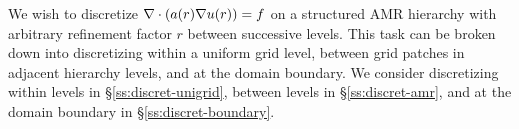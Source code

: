 \documentclass[10pt]{article}
\begin{document}
 \newcommand{\uxp}{u(\indvar+h_x)}
 \newcommand{\uxm}{u(\indvar-h_x)}
 \newcommand{\uxph}{u(\indvar+\frac{h_x}{2})}
 \newcommand{\uxmh}{u(\indvar-\frac{h_x}{2})}

 \newcommand{\uyp}{u(\indvar+h_y)}
 \newcommand{\uym}{u(\indvar-h_y)}
 \newcommand{\uyph}{u(\indvar+\frac{h_y}{2})}
 \newcommand{\uymh}{u(\indvar-\frac{h_y}{2})}

 \newcommand{\uzp}{u(\indvar+h_z)}
 \newcommand{\uzm}{u(\indvar-h_z)}
 \newcommand{\uzph}{u(\indvar+\frac{h_z}{2})}
 \newcommand{\uzmh}{u(\indvar-\frac{h_z}{2})}

 \newcommand{\norm}{\textbf{n}}

 \newcommand{\ac}{a(\indvar)}
 \newcommand{\av}{a(\volel)}
 \newcommand{\as}{a(\surfel)}

 \newcommand{\fc}{f(\indvar)}
 \newcommand{\fv}{f(\volel)}
 \newcommand{\fs}{f(\surfel)}

 \newcommand{\axph}{a(\indvar+h_x/2)}
 \newcommand{\axmh}{a(\indvar-h_x/2)}
 \newcommand{\ayph}{a(\indvar+h_y/2)}
 \newcommand{\aymh}{a(\indvar-h_y/2)}
 \newcommand{\azph}{a(\indvar+h_z/2)}
 \newcommand{\azmh}{a(\indvar-h_z/2)}

 \newcommand{\axpH}{a(\indvar+H_x/2)}

 \newcommand{\alc}{\alpha_{0}}
 \newcommand{\alxp}{\alpha_{x}}
 \newcommand{\alxm}{\alpha_{\bar{x}}}
 \newcommand{\alyp}{\alpha_{y}}
 \newcommand{\alym}{\alpha_{\bar{y}}}
 \newcommand{\alzp}{\alpha_{z}}
 \newcommand{\alzm}{\alpha_{\bar{z}}}

 \newcommand{\Uc}{U_{0}}
 \newcommand{\Uxp}{U_{x}}
 \newcommand{\Uxm}{U_{\bar{x}}}
 \newcommand{\Uyp}{U_{y}}
 \newcommand{\Uym}{U_{\bar{y}}}
 \newcommand{\Uzp}{U_{z}}
 \newcommand{\Uzm}{U_{\bar{z}}}
 \newcommand{\F}{F}

 \newcommand{\vol}{{\Omega_h}}
 \newcommand{\volel}{\textbf{V}}
 \newcommand{\surf}{\partial\vol}
 \newcommand{\surfel}{\textbf{S}}
 \newcommand{\sidexp}{\partial\Omega_h^{+x}}
 \newcommand{\sidexm}{\partial\Omega_h^{-x}}
 \newcommand{\sideyp}{\partial\Omega_h^{+y}}
 \newcommand{\sideym}{\partial\Omega_h^{-y}}
 \newcommand{\sidezp}{\partial\Omega_h^{+z}}
 \newcommand{\sidezm}{\partial\Omega_h^{-z}}

 \newcommand{\sideXP}{\partial\Omega_H^{+x}}


We wish to discretize $\nabla\cdot(\ac \nabla \uc) = f$
on a structured AMR hierarchy with arbitrary refinement factor $r$
between successive levels.  This task can be broken down into
discretizing within a uniform grid level, between grid patches in
adjacent hierarchy levels, and at the domain boundary.  
We consider discretizing within levels in
\S\ref{ss:discret-unigrid}, between
levels in \S\ref{ss:discret-amr}, and at the domain boundary in
\S\ref{ss:discret-boundary}.
\end{document}

